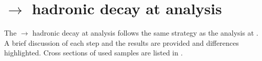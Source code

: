 \begin{table}[!tbp]
\caption[Selection efficiency and number of events for signal and background at .]%
{List of signal and background samples with selection efficiency and number of events at , assuming a luminosity of 1500$fb^{-1}$. The number of events, selection efficiency of pre-selection, selection efficiency of MVA after pre-selection, number of events after MVA are shown. - represents a number less than 0.01.}
\label{tab:doubleHiggs1.4TeVMVA}
\end{table}



\section{\eeToHH $\to$ \HepProcess{ \Pbottom \APbottom \PWplus \PWminus \Pnu \APnu} hadronic decay at  analysis}

The \eeToHH $\to$ \HepProcess{ \Pbottom \APbottom \PWplus \PWminus \Pnu \APnu} hadronic decay at  analysis follows the same strategy as the analysis at . A brief discussion of each step and the results are provided and differences highlighted. Cross sections of used samples are listed in .

